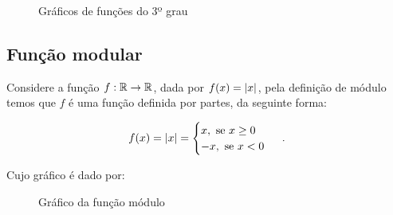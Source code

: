 \begin{itemize}
  \begin{figure}[H]
   \caption{Gráficos de funções do 3º grau}
  \end{figure}

 \end{itemize}


  \subsection{Função modular}

  Considere a função $f: \mathbb{R} \rightarrow \mathbb{R}$, dada por $f(x)= \left|x\right|$, pela definição de módulo temos que $f$ é uma função definida por partes, da seguinte forma:

  \[f(x)= \left|x\right| = \begin{cases}
                 x, \text{ se } x \geq 0 \\
                 -x, \text{ se } x < 0
                \end{cases} \ .\]

 Cujo gráfico é dado por:

  \begin{figure}[H]
 \centering
    \caption{Gráfico da função módulo}
  \end{figure}

